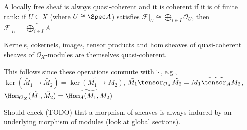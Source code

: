 A locally free sheaf is always quasi-coherent and it is coherent if it is of
finite rank: if $U \subseteq X$ (where $U\cong \Spec A$) satisfies
$\mathcal{F}|_U \cong \bigoplus_{i \in I} \mathcal{O}_U$,
then $\mathcal{F}|_U = \widetilde{\bigoplus_{i \in I} A}$

Kernels, cokernels, images, tensor products and hom sheaves of quasi-coherent
sheaves of $\mathcal{O}_X$-modules are themselves quasi-coherent.

This follows since these operations commute with $\tilde{\cdot}$, e.g.,
$\ker (\tilde{M_1}\to \tilde{M_2}) = \widetilde{\ker(M_1\to M_2)}$,
$\tilde{M_1}\tensor_{\mathcal{O}_X} \tilde{M_2} = \widetilde{M_1\tensor_A M_2}$,
$\Hom_{\mathcal{O}_X}(\tilde{M_1}, \tilde{M_2}) = \widetilde{\Hom_A(M_1, M_2)}$

Should check (TODO) that a morphism of sheaves is always induced by an underlying morphism of
modules (look at global sections).
